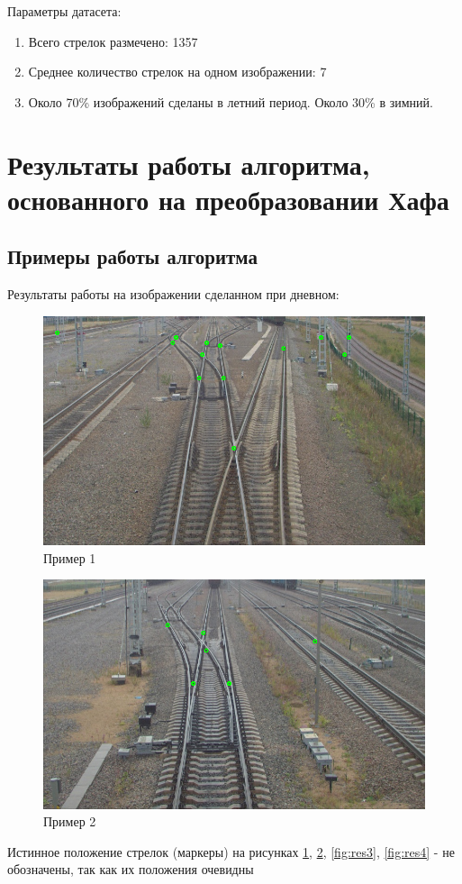 Параметры датасета:
\begin{enumerate}
	\item Всего стрелок размечено: 1357
	\item Среднее количество стрелок на одном изображении: 7
	\item Около 70\% изображений сделаны в летний период. Около 30\% в зимний.
\end{enumerate}

\section{Результаты работы алгоритма, основанного на преобразовании Хафа}
\subsection{Примеры работы алгоритма}
Результаты работы на изображении сделанном при дневном:
\begin{figure}[!h]
	\centering
	\includegraphics[width=0.7\linewidth]{pictures/screenshot0015}
	\caption{Пример 1}
	\label{fig:res1}
\end{figure}
\begin{figure}[!h]
	\centering
	\includegraphics[width=0.7\linewidth]{pictures/screenshot0016}
	\caption{Пример 2}
	\label{fig:res2}
\end{figure}
\newpage

Истинное положение стрелок (маркеры) на рисунках \ref{fig:res1}, \ref{fig:res2}, \ref{fig:res3}, \ref{fig:res4} - не обозначены, так как их положения очевидны

